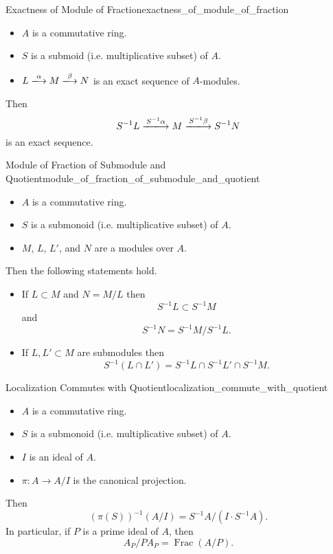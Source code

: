 \documentclass{article}
\begin{document}
\begin{theorem}{Exactness of Module of Fraction}{exactness_of_module_of_fraction}
    \begin{itemize}
        \item $A$ is a commutative ring.
        \item $S$ is a submoid (i.e. multiplicative subset) of $A$.
        \item $L\xlongrightarrow{\alpha} M \xlongrightarrow{\beta} N$ is an exact sequence of $A$-modules.
    \end{itemize}
    Then
    \[ S^{-1}L\xlongrightarrow{S^{-1}\alpha} M \xlongrightarrow{S^{-1}\beta} S^{-1}N \]
    is an exact sequence.
\end{theorem}

\begin{corollary}{Module of Fraction of Submodule and Quotient}{module_of_fraction_of_submodule_and_quotient}
    \begin{itemize}
        \item $A$ is a commutative ring.
        \item $S$ is a submonoid (i.e. multiplicative subset) of $A$.
        \item $M$, $L$, $L'$, and $N$ are a modules over $A$.
    \end{itemize}
    Then the following statements hold.
    \begin{itemize}
        \item If $L\subset M$ and $N = M/L$ then
        \[ S^{-1}L \subset S^{-1}M \]
        and
        \[ S^{-1}N = S^{-1}M/S^{-1}L. \]
        \item If $L,L'\subset M$ are submodules then
        \[ S^{-1}(L\cap L') = S^{-1}L \cap S^{-1}L' \cap S^{-1}M. \]
    \end{itemize}
\end{corollary}

\begin{theorem}{Localization Commutes with Quotient}{localization_commute_with_quotient}
    \begin{itemize}
        \item $A$ is a commutative ring.
        \item $S$ is a submonoid (i.e. multiplicative subset) of $A$.
        \item $I$ is an ideal of $A$.
        \item $\pi: A \rightarrow A/I$ is the canonical projection.
    \end{itemize}
    Then
    \[ (\pi(S))^{-1}(A/I) = S^{-1}A / (I\cdot S^{-1}A). \]
    In particular, if $P$ is a prime ideal of $A$, then
    \[ A_P / PA_P = \operatorname{Frac}(A/P). \]
\end{theorem}

% 
% 
\end{document}
